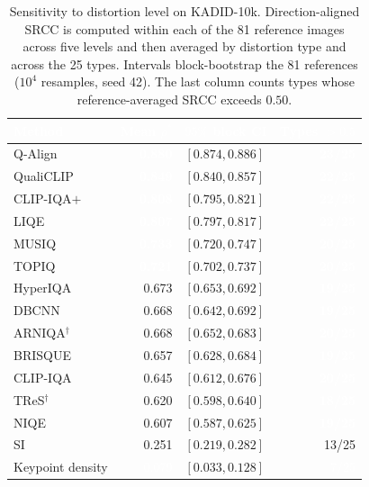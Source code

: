 \documentclass[sn-basic,Numbered]{sn-jnl}
\newcommand{\pfA}[1]{\cellcolor{perf5}\textcolor{white}{\textbf{#1}}}
\newcommand{\pfB}[1]{\cellcolor{perf4}#1}
\newcommand{\pfD}[1]{\cellcolor{perf2}#1}
\newcommand{\pfE}[1]{\cellcolor{perf1}\textcolor{white}{#1}}
\newcommand{\hd}[1]{\textcolor{white}{\textbf{#1}}}
\begin{document}
\begin{table}[!ht]
\centering
\caption{Sensitivity to distortion level on KADID-10k. Direction-aligned SRCC is
computed within each of the 81 reference images across five levels and then
averaged by distortion type and across the 25 types. Intervals block-bootstrap
the 81 references ($10^4$ resamples, seed 42). The last column counts types whose
reference-averaged SRCC exceeds $0.50$.}
\label{tab:sensitivity}
\small
\setlength{\tabcolsep}{6pt}
\renewcommand{\arraystretch}{1.14}
\begin{tabular}{@{}l r l r@{}}
\toprule
\rowcolor{headerblue}
\hd{Method} & \hd{Mean $\rho^{\ast}$} & \hd{$95\%$ block CI} & \hd{Types $>0.5$} \\
\midrule
\rowcolor{rowlight} Q-Align   & \pfA{0.880} & $[0.874,0.886]$ & \pfA{23/25} \\
\rowcolor{rowwhite} QualiCLIP & \pfA{0.849} & $[0.840,0.857]$ & \pfA{22/25} \\
\rowcolor{rowlight} CLIP-IQA$+$ & \pfA{0.808} & $[0.795,0.821]$ & \pfA{22/25} \\
\rowcolor{rowwhite} LIQE      & \pfA{0.807} & $[0.797,0.817]$ & \pfA{22/25} \\
\rowcolor{rowlight} MUSIQ     & \pfA{0.733} & $[0.720,0.747]$ & \pfA{20/25} \\
\rowcolor{rowwhite} TOPIQ     & \pfA{0.721} & $[0.702,0.737]$ & \pfA{20/25} \\
\rowcolor{rowlight} HyperIQA  & \pfB{0.673} & $[0.653,0.692]$ & \pfA{19/25} \\
\rowcolor{rowwhite} DBCNN     & \pfB{0.668} & $[0.642,0.692]$ & \pfA{19/25} \\
\rowcolor{rowlight} ARNIQA$^{\dagger}$ & \pfB{0.668} & $[0.652,0.683]$ & \pfA{20/25} \\
\rowcolor{rowwhite} BRISQUE   & \pfB{0.657} & $[0.628,0.684]$ & \pfA{19/25} \\
\rowcolor{rowlight} CLIP-IQA  & \pfB{0.645} & $[0.612,0.676]$ & \pfA{20/25} \\
\rowcolor{rowwhite} TReS$^{\dagger}$ & \pfB{0.620} & $[0.598,0.640]$ & \pfA{18/25} \\
\rowcolor{rowlight} NIQE      & \pfB{0.607} & $[0.587,0.625]$ & \pfA{19/25} \\
\midrule
\rowcolor{rowwhite} SI              & \pfD{0.251} & $[0.219,0.282]$ & \pfD{13/25} \\
\rowcolor{catbovw!12} Keypoint density & \pfE{0.079} & $[0.033,0.128]$ & \pfE{\ \,7/25} \\

\end{tabular}
\end{table}
\end{document}
